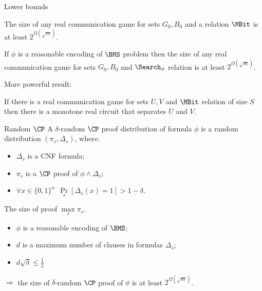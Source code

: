 \begin{frame}{Lower bounds}


    \begin{theorem}[S 2016]
        The size of any real communication game for sets $G_0, B_0$ and a relation $\MBit$ is at least $2^{\Omega(\sqrt{m})}$.

        If $\phi$ is a reasonable encoding of $\BMS$ problem then the size of any real communication game for sets $G_0, B_0$
        and $\Search_{\phi}$ relation is at least $2^{\Omega(\sqrt{m})}$.
    \end{theorem}

    \pause
    More powerful result:
    \begin{theorem}
        If there is a real communication game for sets $U, V$ and $\MBit$ relation of size $S$ then there
        is a monotone real circuit that separates $U$ and $V$.
    \end{theorem}
\end{frame}


\begin{frame}{Random $\CP$}
    A $\delta$-random $\CP$ proof distribution of formula $\phi$ is a random distribution $(\pi_s,
    \Delta_s)$, where:
    \begin{itemize}
        \item $\Delta_s$ is a CNF formula;
        \item $\pi_s$ is a $\CP$ proof of $\phi \land \Delta_s$;
        \item $\forall x \in \{0, 1\}^n ~~ \Pr\limits_s[\Delta_s(x) = 1] > 1 - \delta$.
    \end{itemize}

    The size of proof $\max\limits_s \pi_s$.
    \pause

    \begin{theorem}[S 2016]
        \begin{itemize}
            \item $\phi$ is a reasonable encoding of $\BMS$;
            \item $d$ is a maximum number of clauses in formulas $\Delta_s$;
            \item $d \sqrt{\delta} \le \frac{1}{2}$
        \end{itemize}
        $\Rightarrow$ the size of $\delta$-random $\CP$ proof of $\phi$ is at least
        $2^{\Omega(\sqrt{m})}$.
    \end{theorem}
\end{frame}


